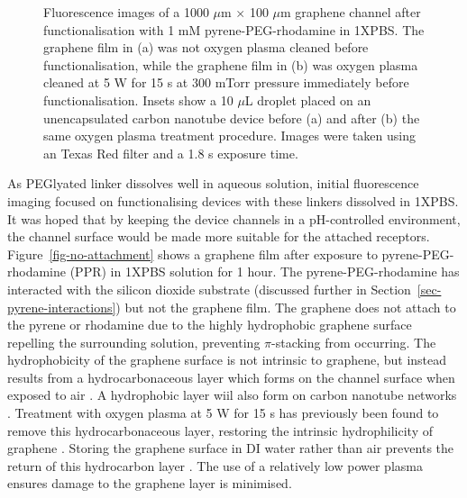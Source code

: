 \documentclass[
  a4paper,
]{scrbook}
\begin{document}
\begin{figure}
\begin{minipage}[t]{0.47\linewidth}
{{}

}

\subcaption{\label{fig-attachment-post-plasma}}
\end{minipage}%

\caption{\label{fig-hydrophobicity}Fluorescence images of a 1000
\(\mu\)m \(\times\) 100 \(\mu\)m graphene channel after
functionalisation with 1 mM pyrene-PEG-rhodamine in 1XPBS. The graphene
film in (a) was not oxygen plasma cleaned before functionalisation,
while the graphene film in (b) was oxygen plasma cleaned at 5 W for 15 s
at 300 mTorr pressure immediately before functionalisation. Insets show
a 10 \(\mu\)L droplet placed on an unencapsulated carbon nanotube device
before (a) and after (b) the same oxygen plasma treatment procedure.
Images were taken using an Texas Red filter and a 1.8 s exposure time.}

\end{figure}

As PEGlyated linker dissolves well in aqueous solution, initial
fluorescence imaging focused on functionalising devices with these
linkers dissolved in 1XPBS. It was hoped that by keeping the device
channels in a pH-controlled environment, the channel surface would be
made more suitable for the attached receptors.
Figure~\ref{fig-no-attachment} shows a graphene film after exposure to
pyrene-PEG-rhodamine (PPR) in 1XPBS solution for 1 hour. The
pyrene-PEG-rhodamine has interacted with the silicon dioxide substrate
(discussed further in Section~\ref{sec-pyrene-interactions}) but not the
graphene film. The graphene does not attach to the pyrene or rhodamine
due to the highly hydrophobic graphene surface repelling the surrounding
solution, preventing \(\pi\)-stacking from occurring. The hydrophobicity
of the graphene surface is not intrinsic to graphene, but instead
results from a hydrocarbonaceous layer which forms on the channel
surface when exposed to air \autocite{Ashraf2014}. A hydrophobic layer
wiil also form on carbon nanotube networks
\autocite{Stando2019,Park2022}. Treatment with oxygen plasma at 5 W for
15 s has previously been found to remove this hydrocarbonaceous layer,
restoring the intrinsic hydrophilicity of graphene \autocite{Shin2010}.
Storing the graphene surface in DI water rather than air prevents the
return of this hydrocarbon layer \autocite{Ashraf2014}. The use of a
relatively low power plasma ensures damage to the graphene layer is
minimised.
\end{document}

